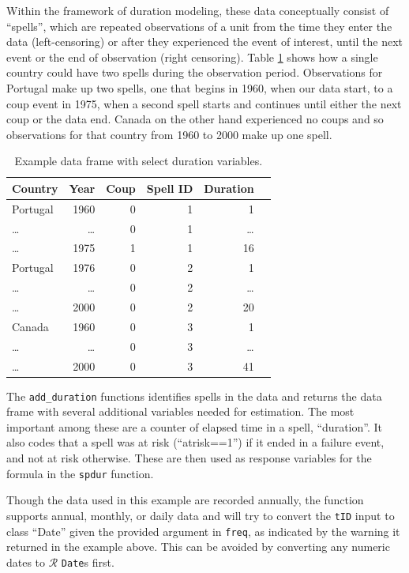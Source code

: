 \documentclass[12pt,onesided]{amsart}
\begin{document}
Within the framework of duration modeling, these data conceptually
consist of ``spells'', which are repeated observations of a unit from
the time they enter the data (left-censoring) or after they experienced
the event of interest, until the next event or the end of observation
(right censoring). Table \ref{tab-ex} shows how a single country could
have two spells during the observation period. Observations for Portugal
make up two spells, one that begins in 1960, when our data start, to a
coup event in 1975, when a second spell starts and continues until
either the next coup or the data end. Canada on the other hand
experienced no coups and so observations for that country from 1960 to
2000 make up one spell.

\begin{table}
\begin{center}
\begin{tabular}{lrrrrr} \toprule
Country & Year & Coup & Spell ID & Duration \\ \midrule
Portugal & 1960 & 0 & 1 & 1  \\ 
\ldots & \ldots & 0 & 1 & \ldots \\
\ldots & 1975 & 1 & 1 & 16 \\ \midrule
Portugal & 1976 & 0 & 2 & 1 \\
\ldots & \ldots & 0 & 2 & \ldots \\
\ldots & 2000 & 0 & 2 & 20  \\ \midrule
Canada & 1960 & 0 & 3 & 1 \\
\ldots & \ldots & 0 & 3 & \ldots \\ 
\ldots & 2000 & 0 & 3 & 41 \\ \bottomrule
\end{tabular}
\end{center}
\caption{Example data frame with select duration variables.} \label{tab-ex}
\end{table}

The \verb|add_duration| functions identifies spells in the data and
returns the data frame with several additional variables needed for
estimation. The most important among these are a counter of elapsed time
in a spell, ``duration''. It also codes that a spell was at risk
(``atrisk==1'') if it ended in a failure event, and not at risk
otherwise. These are then used as response variables for the formula in
the \texttt{spdur} function.

Though the data used in this example are recorded annually, the function
supports annual, monthly, or daily data and will try to convert the
\texttt{tID} input to class ``Date'' given the provided argument in
\texttt{freq}, as indicated by the warning it returned in the example above. This 
can be avoided by converting any numeric dates to $\mathcal{R}$ \texttt{Date}s first.
\end{document}
